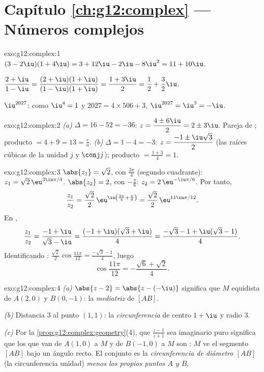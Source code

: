 \section*{Capítulo \ref{ch:g12:complex} --- Números complejos}

\begin{solution}{exo:g12:complex:1}
$(3-2\iu)(1+4\iu) = 3 + 12\iu - 2\iu - 8\iu^2 = 11 + 10\iu$.

$\dfrac{2+\iu}{1-\iu} = \dfrac{(2+\iu)(1+\iu)}{(1-\iu)(1+\iu)}
= \dfrac{1 + 3\iu}{2} = \dfrac12 + \dfrac32\iu$.

$\iu^{2027}$: como $\iu^4 = 1$ y $2027 = 4 \times 506 + 3$,
$\iu^{2027} = \iu^3 = -\iu$.
\end{solution}

\begin{solution}{exo:g12:complex:2}
\emph{(a)} $\Delta = 16 - 52 = -36$:
$z = \dfrac{4 \pm 6\iu}{2} = 2 \pm 3\iu$. Pareja de ; producto
$= 4 + 9 = 13 = \frac ca$. \emph{(b)} $\Delta = 1 - 4 = -3$:
$z = \dfrac{-1 \pm \iu\sqrt3}{2}$ (las raíces cúbicas de la unidad $j$ y
$\conj j$); producto $= \frac{1 + 3}{4} = 1$.
\end{solution}

\begin{solution}{exo:g12:complex:3}
$\abs{z_1} = \sqrt2$, con  $\frac{3\pi}{4}$ (segundo cuadrante):
$z_1 = \sqrt2\,\eu^{3\iu\pi/4}$. $\abs{z_2} = 2$, con 
$-\frac\pi6$: $z_2 = 2\,\eu^{-\iu\pi/6}$. Por tanto,
\[
\frac{z_1}{z_2} = \frac{\sqrt2}{2}\,\eu^{\iu\left(\frac{3\pi}{4} + \frac{\pi}{6}\right)}
= \frac{\sqrt2}{2}\,\eu^{11\iu\pi/12}.
\]
En ,
\[
\frac{z_1}{z_2} = \frac{-1+\iu}{\sqrt3 - \iu}
= \frac{(-1+\iu)(\sqrt3+\iu)}{4}
= \frac{-\sqrt3 - 1 + \iu(\sqrt3 - 1)}{4}.
\]
Identificando :
$\frac{\sqrt2}{2}\cos\frac{11\pi}{12} = \frac{-\sqrt3-1}{4}$, luego
\[
\cos\frac{11\pi}{12} = -\frac{\sqrt6 + \sqrt2}{4}.
\]
\end{solution}

\begin{solution}{exo:g12:complex:4}
\emph{(a)} $\abs{z - 2} = \abs{z - (-\iu)}$ significa que $M$ equidista de
$A(2, 0)$ y $B(0, -1)$: la \emph{mediatriz} de $[AB]$.

\emph{(b)} Distancia $3$ al punto $(1,1)$: la \emph{circunferencia} de
centro $1 + \iu$ y radio $3$.

\emph{(c)} Por la \cref{prop:g12:complex:geometry}(4), que
$\frac{z-1}{z+1}$ sea imaginario puro significa que los  que van de
$A(1,0)$ a $M$ y de $B(-1,0)$ a $M$ son : $M$ ve el segmento
$[AB]$ bajo un ángulo recto. El conjunto es la \emph{circunferencia de
diámetro $[AB]$} (la circunferencia unidad) \emph{menos los propios puntos
$A$ y $B$}.
\end{solution}

